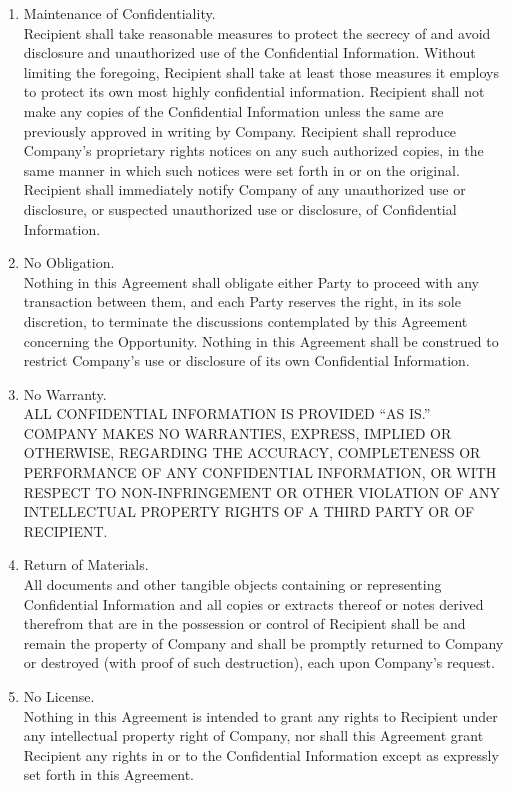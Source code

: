 \documentclass[letterpaper, 12pt]{article}
\begin{document}
\begin{enumerate}
    \item Maintenance of Confidentiality.\\
    Recipient shall take reasonable measures to protect the secrecy of and avoid disclosure and unauthorized use of the Confidential Information. Without limiting the foregoing, Recipient shall take at least those measures it employs to protect its own most highly confidential information. Recipient shall not make any copies of the Confidential Information unless the same are previously
approved in writing by Company. Recipient shall reproduce Company’s proprietary rights notices on any such authorized copies, in the same manner in which such notices were set forth in or on the original. Recipient shall immediately notify Company of any unauthorized use or disclosure, or suspected unauthorized use or disclosure, of Confidential Information.
    \item No Obligation.\\
    Nothing in this Agreement shall obligate either Party to proceed with any transaction between them, and each Party reserves the
right, in its sole discretion, to terminate the discussions contemplated by this Agreement concerning the Opportunity. Nothing in this Agreement shall be construed to restrict Company’s use or disclosure of its own Confidential Information.
    \item No Warranty.\\
    ALL CONFIDENTIAL INFORMATION IS PROVIDED “AS IS.” COMPANY MAKES NO WARRANTIES, EXPRESS, IMPLIED OR OTHERWISE, REGARDING THE ACCURACY, COMPLETENESS OR PERFORMANCE OF ANY CONFIDENTIAL INFORMATION, OR WITH RESPECT TO NON-INFRINGEMENT OR OTHER VIOLATION OF ANY INTELLECTUAL PROPERTY RIGHTS OF A THIRD PARTY OR OF RECIPIENT.
    \item Return of Materials.\\
    All documents and other tangible objects containing or representing Confidential Information and all copies or extracts thereof or notes derived therefrom that are in the possession or control of Recipient shall be and remain the property of Company and shall be promptly returned to Company or destroyed (with proof of such destruction), each upon Company’s request.
    \item No License.\\
    Nothing in this Agreement is intended to grant any rights to Recipient under any intellectual property right of Company, nor shall this Agreement grant Recipient any rights in or to the Confidential Information except as expressly set forth in this Agreement.

\end{enumerate}
\end{document}
